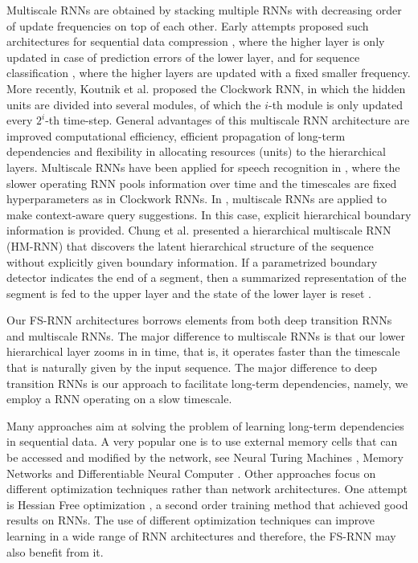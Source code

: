 \documentclass{article}
\begin{document}
Multiscale RNNs are obtained by stacking multiple  RNNs with decreasing order of update frequencies on top of each other. Early attempts proposed such  architectures for sequential data compression \cite{schmidhuber1992learning}, where the higher layer is only updated in case of prediction errors of the lower layer, and for sequence classification \cite{el1995hierarchical}, where the higher layers are updated with a fixed smaller frequency. More recently, Koutnik et al. \cite{koutnik2014clockwork} proposed the Clockwork RNN, in which the hidden units are divided into several modules, of which the $i$-th module is only updated every $2^i$-th time-step. General advantages of this multiscale RNN architecture are improved computational efficiency, efficient propagation of long-term dependencies and flexibility in allocating resources (units) to the hierarchical layers. 
Multiscale RNNs have been applied for speech recognition in \cite{bahdanau2016timepooling}, where the slower operating RNN pools information over time and the timescales are fixed hyperparameters as in Clockwork RNNs. In \cite{sordoni2015hierarchical}, multiscale RNNs are applied to make context-aware query suggestions. In this case, explicit hierarchical boundary information is provided. Chung et al. \cite{chung2016multiscale}  presented a hierarchical multiscale RNN (HM-RNN) that discovers the latent hierarchical structure of the sequence without explicitly given boundary information. If a parametrized boundary detector indicates the end of a segment, then a summarized representation of the segment is fed to the upper layer and the state of the lower layer is reset \cite{chung2016multiscale}. 


 Our FS-RNN architectures borrows elements from both deep transition RNNs and multiscale RNNs. The major difference to multiscale RNNs is that our lower hierarchical layer zooms in in time, that is, it operates faster than the timescale that is naturally given by the input sequence. The major difference to deep transition RNNs is our approach to facilitate long-term dependencies, namely, we employ a RNN operating on a slow timescale.






 Many approaches aim at solving the problem of learning long-term dependencies in sequential data. A very popular one is to use external memory cells that can be accessed and modified by the network, see  Neural Turing Machines \cite{graves2014neural}, Memory Networks \cite{weston2014memory} and Differentiable Neural Computer \cite{graves2016hybrid}. Other approaches  focus on different optimization techniques rather than network architectures. One attempt is Hessian Free optimization \cite{martens2011learning}, a second order training method that achieved good results on RNNs. The use of different optimization techniques can improve learning in a wide range of RNN architectures and therefore, the FS-RNN may also benefit from it.
\end{document}
